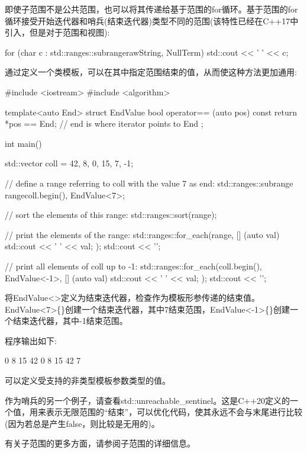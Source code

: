 即使子范围不是公共范围，也可以将其传递给基于范围的for循环。基于范围的for循环接受开始迭代器和哨兵(结束迭代器)类型不同的范围(该特性已经在C++17中引入，但是对于范围和视图):

\begin{cpp}
for (char c : std::ranges::subrange{rawString, NullTerm{}}) {
	std::cout << ' ' << c;
}
\end{cpp}

通过定义一个类模板，可以在其中指定范围结束的值，从而使这种方法更加通用:


\begin{cpp}
#include <iostream>
#include <algorithm>

template<auto End>
struct EndValue {
	bool operator== (auto pos) const {
		return *pos == End; // end is where iterator points to End
	}
};

int main()
{
	std::vector coll = {42, 8, 0, 15, 7, -1};
	
	// define a range referring to coll with the value 7 as end:
	std::ranges::subrange range{coll.begin(), EndValue<7>{}};
	
	// sort the elements of this range:
	std::ranges::sort(range);
	
	// print the elements of the range:
	std::ranges::for_each(range,
						[] (auto val) {
							std::cout << ' ' << val;
						});
	std::cout << '\n';
	
	// print all elements of coll up to -1:
	std::ranges::for_each(coll.begin(), EndValue<-1>{},
							[] (auto val) {
								std::cout << ' ' << val;
							});
	std::cout << '\n';
}
\end{cpp}

将EndValue<>定义为结束迭代器，检查作为模板形参传递的结束值。EndValue<7>\{\}创建一个结束迭代器，其中7结束范围，EndValue<-1>\{\}创建一个结束迭代器，其中-1结束范围。

程序输出如下:

\begin{shell}
0 8 15 42
0 8 15 42 7
\end{shell}

可以定义受支持的非类型模板参数类型的值。

作为哨兵的另一个例子，请查看std::unreachable\_sentinel。这是C++20定义的一个值，用来表示无限范围的“结束”，可以优化代码，使其永远不会与末尾进行比较(因为若总是产生false，则比较是无用的)。

有关子范围的更多方面，请参阅子范围的详细信息。

